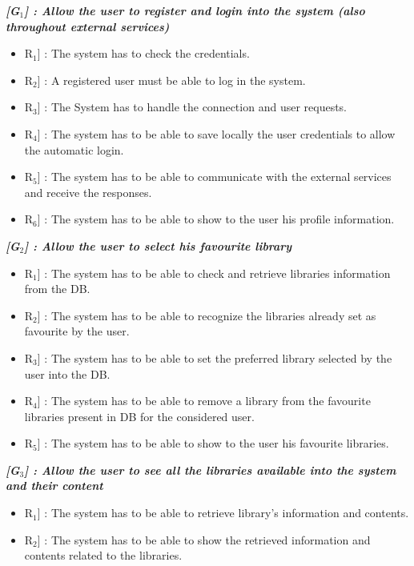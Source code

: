 \vspace*{-5mm}

\vspace{0.2cm}
\vspace{0.5cm}
\noindent
\emph{\textbf{[G$_{1}$] : Allow the user to register and login into the system (also throughout external services)}}
\begin{itemize}
	\setlength{\leftskip}{0.5cm}
	\item \lbrack R$_{1}$] : The system has to check the credentials.
	\item \lbrack R$_{2}$] : A registered user must be able to log in the system.
	\item \lbrack R$_{3}$] : The System has to handle the connection and user requests.
	\item \lbrack R$_{4}$] : The system has to be able to save locally the user credentials to allow the automatic login.
	\item \lbrack R$_{5}$] : The system has to be able to communicate with the external services and receive the responses.
	\item \lbrack R$_{6}$] : The system has to be able to show to the user his profile information.
\end{itemize}

\vspace{0.5cm}
\noindent
\emph{\textbf{[G$_{2}$] : Allow the user to select his favourite library}}
\begin{itemize}
	\setlength{\leftskip}{0.5cm}
	\item \lbrack R$_{1}$] : The system has to be able to check and retrieve libraries information from the DB.
	\item \lbrack R$_{2}$] : The system has to be able to recognize the libraries already set as favourite by the user.
	\item \lbrack R$_{3}$] : The system has to be able to set the preferred library selected by the user into the DB.
	\item \lbrack R$_{4}$] : The system has to be able to remove a library from the favourite libraries present in DB for the considered user.
	\item \lbrack R$_{5}$] : The system has to be able to show to the user his favourite libraries.
\end{itemize}

\vspace{0.5cm}
\noindent
\emph{\textbf{[G$_{3}$] : Allow the user to see all the libraries available into the system and their content}}
\begin{itemize}
	\setlength{\leftskip}{0.5cm}
	\item \lbrack R$_{1}$] : The system has to be able to retrieve library’s information and contents.
	\item \lbrack R$_{2}$] : The system has to be able to show the retrieved information and contents related to the libraries.
\end{itemize}

